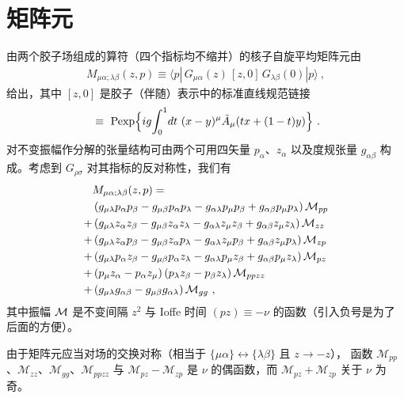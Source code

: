 \section{矩阵元}

由两个胶子场组成的算符（四个指标均不缩并）的核子自旋平均矩阵元由
\begin{align}
{ M}_{\mu \alpha; \lambda \beta } (z,p) \equiv \langle p | \,
G_{\mu \alpha} (z) \, [z,0]\, G_{\lambda \beta} (0) | p \rangle \ ,
\end{align}
给出，其中 $[z,0]$ 是胶子（伴随）表示中的标准直线规范链接
\begin{align}
[x,y]~\equiv~{\rm Pexp}\Big\{ig\!\int_0^1\! dt~(x-y)^\mu \tilde{A}_\mu(tx+(1-t)y)\Big\}
\ .
\label{straightE}
\end{align}
对不变振幅作分解的张量结构可由两个可用四矢量 $p_\alpha$、$z_\alpha$
以及度规张量 $g_{\alpha \beta}$ 构成。考虑到 $G_{\rho \sigma}$ 对其指标的反对称性，我们有
\begin{align}
& { M}_{\mu \alpha; \lambda \beta} (z,p)= \nonumber \\ &
\left( g_{\mu\lambda} p_\alpha p_\beta - g_{\mu\beta} p_\alpha p_\lambda - g_{\alpha\lambda} p_\mu p_\beta + g_{\alpha\beta} p_\mu p_\lambda \right) \mathcal{M}_{pp} \nonumber \\
+& \left( g_{\mu\lambda} z_\alpha z_\beta - g_{\mu\beta} z_\alpha z_\lambda - g_{\alpha\lambda} z_\mu z_\beta + g_{\alpha\beta} z_\mu z_\lambda \right) \mathcal{M}_{zz} \nonumber \\
+ & \left( g_{\mu\lambda} z_\alpha p_\beta - g_{\mu\beta} z_\alpha p_\lambda - g_{\alpha\lambda} z_\mu p_\beta + g_{\alpha\beta} z_\mu p_\lambda \right) \mathcal{M}_{zp} \nonumber \\
+ & \left( g_{\mu\lambda} p_\alpha z_\beta - g_{\mu\beta} p_\alpha z_\lambda - g_{\alpha\lambda} p_\mu z_\beta + g_{\alpha\beta} p_\mu z_\lambda \right) \mathcal{M}_{pz} \nonumber \\
+& \left( p_\mu z_\alpha - p_\alpha z_\mu\right) \left( p_\lambda z_\beta - p_\beta z_\lambda\right) \mathcal{M}_{ppzz}
\nonumber \\  + & \left(g_{\mu\lambda} g_{\alpha\beta} -g_{\mu\beta} g_{\alpha\lambda} \right)\mathcal{M}_{gg} \ ,
\label{Manb}
\end{align}
其中振幅 ${\cal M}$ 是不变间隔 $z^2$ 与 Ioffe 时间 \cite{Ioffe:1969kf}
$(pz)\equiv - \nu$ 的函数（引入负号是为了后面的方便）。

由于矩阵元应当对场的交换对称（相当于 $\{\mu \alpha\} \leftrightarrow \{\lambda \beta\}$ 且 $z \to -z$），
函数 $\mathcal{M}_{pp}$、$\mathcal{M}_{zz}$、$\mathcal{M}_{gg}$、$\mathcal{M}_{ppzz}$ 与
$\mathcal{M}_{pz} - \mathcal{M}_{zp}$ 是 $\nu$ 的偶函数，而 $\mathcal{M}_{pz} + \mathcal{M}_{zp}$ 关于 $\nu$
为奇。

